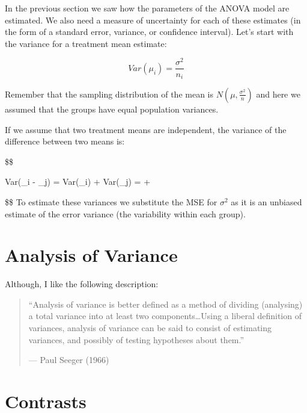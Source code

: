 \documentclass[
  letterpaper,
  DIV=11,
  numbers=noendperiod,
  oneside]{scrreprt}
\begin{document}
In the previous section we saw how the parameters of the ANOVA model are
estimated. We also need a measure of uncertainty for each of these
estimates (in the form of a standard error, variance, or confidence
interval). Let's start with the variance for a treatment mean estimate:


\[Var(\mu_i) = \frac{\sigma^2}{n_i} \]

Remember that the sampling distribution of the mean is
\(N(\mu,\frac{\sigma^2}{n})\) and here we assumed that the groups have
equal population variances.

If we assume that two treatment means are independent, the variance of
the difference between two means is:

\$\$

Var(\hat{\mu}\_i - \hat{\mu}\_j) = Var(\hat{\mu}\_i) + Var(\hat{\mu}\_j)
=  + 

\$\$ To estimate these variances we substitute the MSE for \(\sigma^2\)
as it is an unbiased estimate of the error variance (the variability
within each group).

\chapter{Analysis of Variance}\label{analysis-of-variance}

Although, I like the following description:

\begin{quote}
``Analysis of variance is better defined as a method of dividing
(analysing) a total variance into at least two components\ldots Using a
liberal definition of variances, analysis of variance can be said to
consist of estimating variances, and possibly of testing hypotheses
about them.''

--- Paul Seeger (1966)
\end{quote}

\chapter{Contrasts}\label{contrasts}
\end{document}
